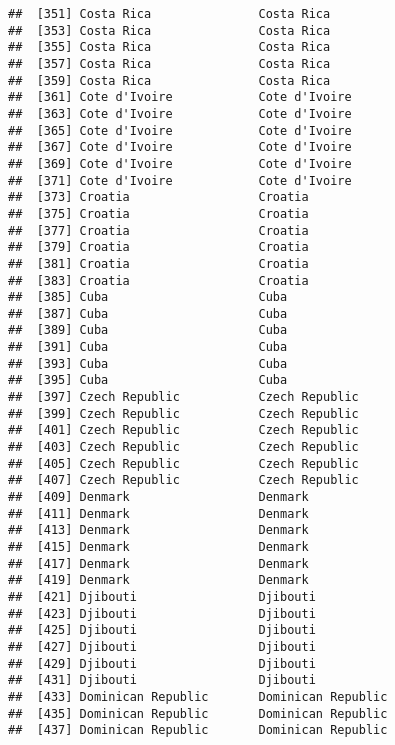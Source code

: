 \documentclass[]{article}
\begin{document}
\begin{verbatim}
##  [351] Costa Rica               Costa Rica              
##  [353] Costa Rica               Costa Rica              
##  [355] Costa Rica               Costa Rica              
##  [357] Costa Rica               Costa Rica              
##  [359] Costa Rica               Costa Rica              
##  [361] Cote d'Ivoire            Cote d'Ivoire           
##  [363] Cote d'Ivoire            Cote d'Ivoire           
##  [365] Cote d'Ivoire            Cote d'Ivoire           
##  [367] Cote d'Ivoire            Cote d'Ivoire           
##  [369] Cote d'Ivoire            Cote d'Ivoire           
##  [371] Cote d'Ivoire            Cote d'Ivoire           
##  [373] Croatia                  Croatia                 
##  [375] Croatia                  Croatia                 
##  [377] Croatia                  Croatia                 
##  [379] Croatia                  Croatia                 
##  [381] Croatia                  Croatia                 
##  [383] Croatia                  Croatia                 
##  [385] Cuba                     Cuba                    
##  [387] Cuba                     Cuba                    
##  [389] Cuba                     Cuba                    
##  [391] Cuba                     Cuba                    
##  [393] Cuba                     Cuba                    
##  [395] Cuba                     Cuba                    
##  [397] Czech Republic           Czech Republic          
##  [399] Czech Republic           Czech Republic          
##  [401] Czech Republic           Czech Republic          
##  [403] Czech Republic           Czech Republic          
##  [405] Czech Republic           Czech Republic          
##  [407] Czech Republic           Czech Republic          
##  [409] Denmark                  Denmark                 
##  [411] Denmark                  Denmark                 
##  [413] Denmark                  Denmark                 
##  [415] Denmark                  Denmark                 
##  [417] Denmark                  Denmark                 
##  [419] Denmark                  Denmark                 
##  [421] Djibouti                 Djibouti                
##  [423] Djibouti                 Djibouti                
##  [425] Djibouti                 Djibouti                
##  [427] Djibouti                 Djibouti                
##  [429] Djibouti                 Djibouti                
##  [431] Djibouti                 Djibouti                
##  [433] Dominican Republic       Dominican Republic      
##  [435] Dominican Republic       Dominican Republic      
##  [437] Dominican Republic       Dominican Republic      

\end{verbatim}
\end{document}
